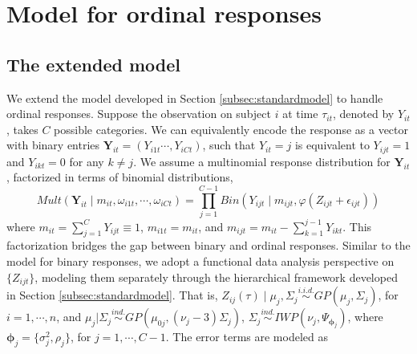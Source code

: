 
\section{Model for ordinal responses}
\label{sec:polyordinalmodel}

\subsection{The extended model}
\label{subsec:ordinalmodel}

We extend the model developed in Section \ref{subsec:standardmodel} to handle ordinal responses. 
Suppose the observation on subject $i$ at time $\tau_{it}$, denoted by $Y_{it}$, takes $C$ possible 
categories. We can equivalently encode the response as a vector with binary entries 
$\mathbf{Y}_{it}=(Y_{i1t}\cdots,Y_{iCt})$, such that $Y_{it}=j$ is equivalent to $Y_{ijt}=1$ 
and $Y_{ikt}=0$ for any $k\neq j$. We assume a multinomial response distribution for 
$\mathbf{Y}_{it}$, factorized in terms of binomial distributions,
\begin{equation}
	Mult(\mathbf{Y}_{it}\mid m_{it},\omega_{i1t},\cdots,\omega_{iCt})=\prod_{j=1}^{C-1}Bin(Y_{ijt}\mid m_{ijt},\varphi(Z_{ijt}+\epsilon_{ijt}))
	\label{eq:factmulti}
\end{equation}
where $m_{it}=\sum_{j=1}^CY_{ijt}\equiv 1$, $m_{i1t}=m_{it}$, and $m_{ijt}=m_{it}-\sum_{k=1}^{j-1}Y_{ikt}$. %
This factorization bridges the gap between binary and ordinal responses. Similar to the model 
for binary responses, we adopt a functional data analysis perspective on $\{Z_{ijt}\}$, modeling 
them separately through the hierarchical framework developed in Section \ref{subsec:standardmodel}. 
That is, $Z_{ij}(\tau)\mid \mu_j,\Sigma_j\stackrel{i.i.d.}{\sim} GP(\mu_j,\Sigma_j)$, 
for $i=1,\cdots,n$, and $\mu_j|\Sigma_j\stackrel{ind.}{\sim} GP(\mu_{0j}, (\nu_j -3) \Sigma_j)$, $\Sigma_j\stackrel{ind.}{\sim}IWP(\nu_j,\Psi_{\boldsymbol{\phi}_j})$, where 
$\boldsymbol{\phi}_j=\{\sigma^2_j,\rho_j\}$, for $j=1,\cdots,C-1$. The error terms are modeled as 
